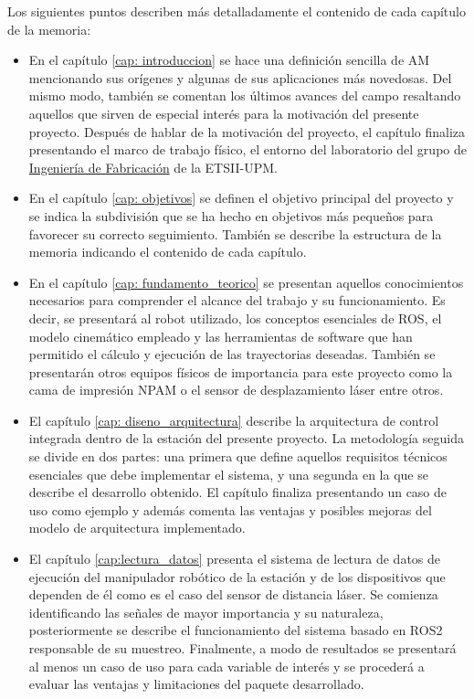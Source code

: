 Los siguientes puntos describen más detalladamente el contenido de cada capítulo de la memoria:

\begin{itemize}
    \item En el capítulo \ref{cap: introduccion}  se hace una definición sencilla de \acrshort{AM} mencionando sus orígenes y algunas de sus aplicaciones más novedosas. Del mismo modo, también se comentan los últimos avances del campo resaltando aquellos que sirven de especial interés para la motivación del presente proyecto. Después de hablar de la motivación del proyecto, el capítulo finaliza presentando el marco de trabajo físico, el entorno del laboratorio del grupo de \href{https://fabricacion.industriales.upm.es/}{Ingeniería de Fabricación} de la ETSII-UPM.

    \item En el capítulo \ref{cap: objetivos} se definen el objetivo principal del proyecto y se indica la subdivisión que se ha hecho en objetivos más pequeños para favorecer su correcto seguimiento. También se describe la estructura de la memoria indicando el contenido de cada capítulo.

    \item En el capítulo \ref{cap: fundamento_teorico} se presentan aquellos conocimientos necesarios para comprender el alcance del trabajo y su funcionamiento. Es decir, se presentará al robot utilizado, los conceptos esenciales de \acrshort{ROS}, el modelo cinemático empleado y las herramientas de software que han permitido el cálculo y ejecución de las trayectorias deseadas. También se presentarán otros equipos físicos de importancia para este proyecto como la cama de impresión \acrshort{NPAM} o el sensor de desplazamiento láser entre otros.

    \item El capítulo \ref{cap: diseno_arquitectura} describe la arquitectura de control integrada dentro de la estación del presente proyecto. La metodología seguida se divide en dos partes: una primera que define aquellos requisitos técnicos esenciales que debe implementar el sistema, y una segunda en la que se describe el desarrollo obtenido. El capítulo finaliza presentando un caso de uso como ejemplo y además comenta las ventajas y posibles mejoras del modelo de arquitectura implementado.

    \item El capítulo \ref{cap:lectura_datos} presenta el sistema de lectura de datos de ejecución del manipulador robótico de la estación y de los dispositivos que dependen de él como es el caso del sensor de distancia láser. Se comienza identificando las señales de mayor importancia y su naturaleza, posteriormente se describe el funcionamiento del sistema basado en ROS2 responsable de su muestreo. Finalmente, a modo de resultados se presentará al menos un caso de uso para cada variable de interés y se procederá a evaluar las ventajas y limitaciones del paquete desarrollado.


\end{itemize}

